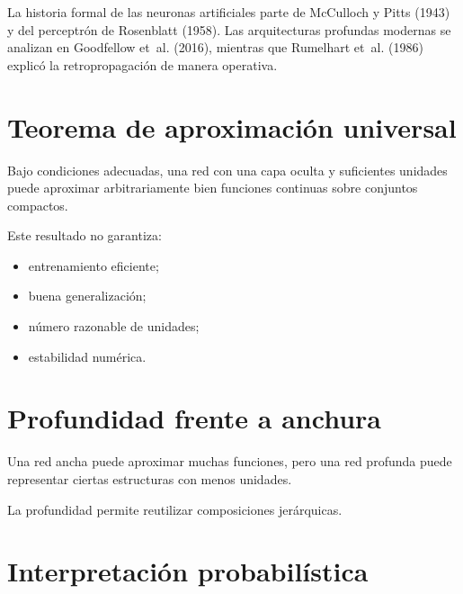 \documentclass[
  spanish,
  10.5pt,
  letterpaper,
  DIV=11,
  numbers=noendperiod,
  oneside,
  open=any]{scrreprt}
\providecommand{\tightlist}{%
  \setlength{\itemsep}{0pt}\setlength{\parskip}{0pt}}
\theoremstyle{definition}
\theoremstyle{definition}
\theoremstyle{plain}
\theoremstyle{remark}
\begin{document}
La historia formal de las neuronas artificiales parte de McCulloch y
Pitts (1943) y del perceptrón de Rosenblatt (1958). Las arquitecturas
profundas modernas se analizan en Goodfellow et~al. (2016), mientras que
Rumelhart et~al. (1986) explicó la retropropagación de manera operativa.

\section*{Teorema de aproximación
universal}\label{teorema-de-aproximaciuxf3n-universal}


Bajo condiciones adecuadas, una red con una capa oculta y suficientes
unidades puede aproximar arbitrariamente bien funciones continuas sobre
conjuntos compactos.

Este resultado no garantiza:

\begin{itemize}
\tightlist
\item
  entrenamiento eficiente;
\item
  buena generalización;
\item
  número razonable de unidades;
\item
  estabilidad numérica.
\end{itemize}

\section*{Profundidad frente a
anchura}\label{profundidad-frente-a-anchura}


Una red ancha puede aproximar muchas funciones, pero una red profunda
puede representar ciertas estructuras con menos unidades.

La profundidad permite reutilizar composiciones jerárquicas.

\section*{Interpretación
probabilística}\label{interpretaciuxf3n-probabiluxedstica-1}

\end{document}
